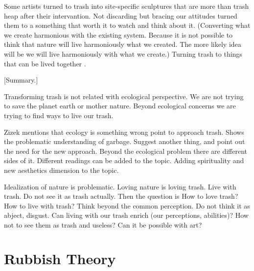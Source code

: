 Some artists turned to trash into site-specific sculptures that are more than trash heap after their intervantion. Not discarding but bracing our attitudes turned them to a something that worth it to watch and think about it. (Converting what we create harmonious with the existing system. Because it is not possible to think that nature will live harmoniously what we created. The more likely idea will be we will live harmoniously with what we create.) Turning trash to things that can be lived together .


[Summary.] 

Transforming trash is not related with ecological perspective. We are not trying to save the planet earth or mother nature. Beyond ecological concerns we are trying to find ways to live our trash. 

Zizek mentions that ecology is something wrong point to approach trash. Shows the problematic understanding of garbage. Suggest another thing, and point out the need for the new approach. Beyond the ecological problem there are different sides of it. Different readings can be added to the topic. Adding spirituality and new aesthetics dimension to the topic. 

Idealization of nature is problematic. Loving nature is loving trash. Live with trash. Do not see it as trash actually. Then the question is How to love trash? How to live with trash? Think beyond the common perception. Do not think it as abject, disgust. Can living with our trash enrich (our perceptions, abilities)? How not to see them as trash and useless? Can it be possible with art?






%
%
\section{Rubbish Theory}

